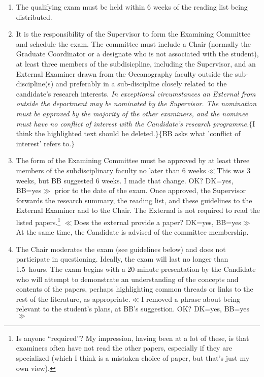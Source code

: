 \documentclass[12pt]{article}
\newcommand{\fixme}[1]{\color{fixmeColor}$\{$#1$\}$\color{black}\index{$>>>>$FIXME$<<<<$}}
\newcommand{\vote}[1]{\color{voteColor}$\ll$#1$\gg$\color{black}\marginpar[$\gg$ vote]{$\ll$ vote}\index{$>>>>$VOTE$<<<<$}}
\newcommand{\discuss}[1]{\footnote{\color{fixmeColor}#1\color{black}}\index{$>>>>$DISCUSS$<<<<$}}
\newcommand{\supervisor}{Supervisor\xspace}
\newcommand{\GC}{Graduate Coordinator\xspace}
\begin{document}
\begin{enumerate}
    \item The qualifying exam must be held within 6 weeks of the reading list
        being distributed. 

    \item It is the responsibility of the \supervisor to form the Examining
        Committee and schedule the exam. The committee must include a Chair (normally
        the \GC or a designate who is not associated with the student),
        at least three members of
        the subdisicpline, including the \supervisor, and an External Examiner
        drawn from the Oceanography faculty outside the sub-discipline(s) and
        preferably in a sub-discipline closely related to the candidate’s
        research interests. \emph{In exceptional circumstances an External from
        outside the department may be nominated by the \supervisor. The
        nomination must be approved by the majority of the other
        examiners, and the
        nominee must have no conflict of interest with the Candidate's research
        programme.}\fixme{I think the highlighted text should be
        deleted.}\fixme{BB asks what 'conflict of interest' refers to.}

    \item The form of the Examining Committee must be approved by at least
        three members of the subdisciplinary faculty no later than 6 weeks\vote{This was 3 weeks, but BB suggested 6 weeks. I made that change. OK? DK=yes, BB=yes}
        prior to the date of the exam. Once approved, the \supervisor forwards
        the research summary, the reading list, and these guidelines to the
        External Examiner and to the Chair. The External is not required to
        read the listed papers.\discuss{Is anyone ``required''? My impression,
        having been at a lot of these, is that examiners often have not read
        the other papers, especially if they are specialized (which I think
        is a mistaken choice of paper, but that's just my own view).}
        \vote{Does the external provide a paper? DK=yes, BB=yes}
        At the same time, the Candidate is
        advised of the committee membership. 

    \item The Chair moderates the exam (see guidelines below) and does not
        participate in questioning. Ideally, the exam will last no longer than
        1.5~hours. The exam begins with a 20-minute presentation by the
        Candidate who will attempt to demonstrate an understanding of the
        concepts and contents of the papers, perhaps highlighting common
        threads or links to the rest of the literature,
        as appropriate.\vote{I removed a phrase about being relevant to the
        student's plans, at BB's suggestion. OK? DK=yes, BB=yes}


\end{enumerate}
\end{document}
